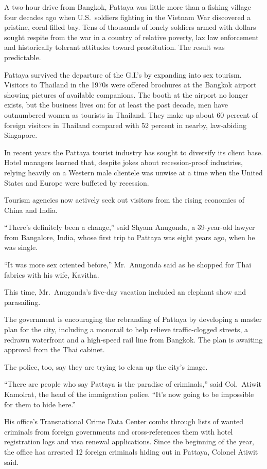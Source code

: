 ﻿\documentclass[12pt]{article}
\begin{document}
A two-hour drive from Bangkok, Pattaya was little more than a fishing village four decades ago when
U.S.~soldiers fighting in the Vietnam War discovered a pristine, coral-filled bay. Tens of thousands
of lonely soldiers armed with dollars sought respite from the war in a country of relative poverty,
lax law enforcement and historically tolerant attitudes toward prostitution. The result was
predictable.

Pattaya survived the departure of the G.I.'s by expanding into sex tourism. Visitors to Thailand in
the 1970s were offered brochures at the Bangkok airport showing pictures of available companions.
The booth at the airport no longer exists, but the business lives on: for at least the past decade,
men have outnumbered women as tourists in Thailand. They make up about 60 percent of foreign
visitors in Thailand compared with 52 percent in nearby, law-abiding Singapore.

In recent years the Pattaya tourist industry has sought to diversify its client base. Hotel managers
learned that, despite jokes about recession-proof industries, relying heavily on a Western male
clientele was unwise at a time when the United States and Europe were buffeted by recession.

Tourism agencies now actively seek out visitors from the rising economies of China and India.

``There's definitely been a change,'' said Shyam Anugonda, a 39-year-old lawyer from Bangalore,
India, whose first trip to Pattaya was eight years ago, when he was single.

``It was more sex oriented before,'' Mr.~Anugonda said as he shopped for Thai fabrics with his wife,
Kavitha.

This time, Mr.~Anugonda's five-day vacation included an elephant show and parasailing.

The government is encouraging the rebranding of Pattaya by developing a master plan for the city,
including a monorail to help relieve traffic-clogged streets, a redrawn waterfront and a high-speed
rail line from Bangkok. The plan is awaiting approval from the Thai cabinet.

The police, too, say they are trying to clean up the city's image.

``There are people who say Pattaya is the paradise of criminals,'' said Col.~Atiwit Kamolrat, the
head of the immigration police. ``It's now going to be impossible for them to hide here.''

His office's Transnational Crime Data Center combs through lists of wanted criminals from foreign
governments and cross-references them with hotel registration logs and visa renewal applications.
Since the beginning of the year, the office has arrested 12 foreign criminals hiding out in Pattaya,
Colonel Atiwit said.
\end{document}
